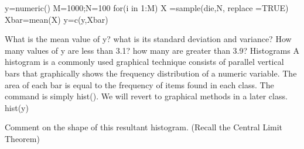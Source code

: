y=numeric()
M=1000;N=100
for(i in 1:M)
{
X =sample(die,N, replace =TRUE)
Xbar=mean(X)
y=c(y,Xbar)
}

What is the mean value of y? what is its standard deviation and variance?
How many values of  y are less than 3.1? how many are greater than 3.9?
Histograms
A histogram is a commonly used graphical technique consists of parallel vertical bars that graphically shows the frequency distribution of a numeric  variable. The area of each bar is equal to the frequency of items found in each class.
The command is simply hist(). 
We will revert to graphical methods in a later class.
hist(y)

Comment on the shape of this resultant histogram. (Recall the  Central Limit Theorem)




